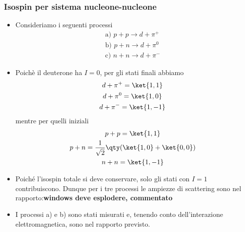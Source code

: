 \subsubsection{Isospin per sistema nucleone-nucleone}
\begin{itemize}
\item Consideriamo i seguenti processi
    \begin{gather*}
    \text{a) }p+p\to d+\pi^+\\
    \text{b) }p+n\to d+\pi^0\\
    \text{c) }n+n\to d+\pi^-
    \end{gather*}
\item Poichè il deuterone ha $I=0$, per gli stati finali abbiamo 
\begin{gather*}
    d+\pi^+=\ket{1,1}\\
    d+\pi^0=\ket{1,0}\\
    d+\pi^-=\ket{1,-1}
\end{gather*}
mentre per quelli iniziali
\begin{gather*}
    p+p=\ket{1,1}\\
    p+n=\frac1{\sqrt2}\qty(\ket{1,0}+\ket{0,0})\\
    n+n=\ket{1,-1}
\end{gather*}
\item Poiché l'isospin totale si deve conservare, solo gli stati con $I=1$ contribuiscono. Dunque per i tre processi le ampiezze di scattering sono nel rapporto:\textbf{windows deve esplodere, commentato}
\item I processi a) e b) sono stati misurati e, tenendo conto dell'interazione elettromagnetica, sono nel rapporto previsto.
\end{itemize}
